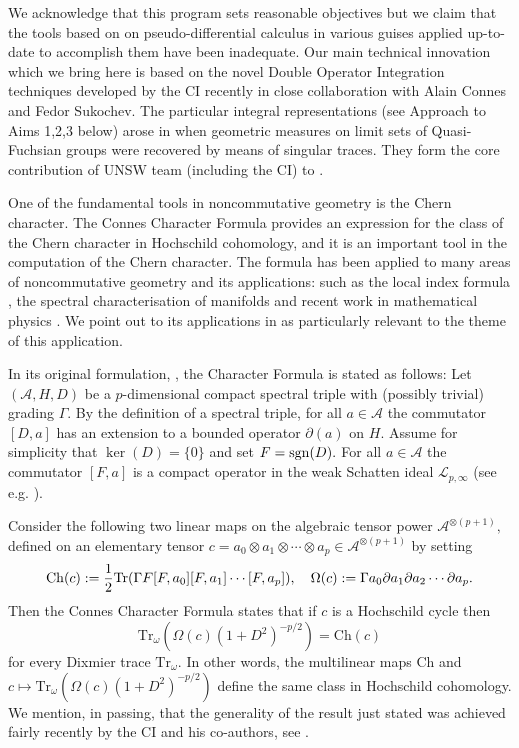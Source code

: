 \documentclass[12pt]{article}
\begin{document}
We acknowledge that this program sets reasonable objectives but we claim that the tools based on on pseudo-differential calculus in various guises applied up-to-date to accomplish them have been inadequate. Our main technical innovation which we bring here is based on the novel Double Operator Integration techniques developed by the CI recently in close collaboration with Alain Connes and Fedor Sukochev. The particular integral representations (see Approach to Aims 1,2,3 below) arose in \cite{Connes_team} when geometric measures on limit sets of Quasi-Fuchsian groups were recovered by means of singular traces. They form the core contribution of UNSW team (including the CI) to \cite{Connes_team}.


One of the fundamental tools in noncommutative geometry is the Chern character. The Connes Character Formula provides an expression for the class of the Chern character in Hochschild cohomology, and it is an important tool in the computation of the Chern character. The formula has been applied to many areas of noncommutative geometry and its applications: such as the local index formula \cite{ConnesMoscovici}, the spectral characterisation of manifolds \cite{Connes-reconstruction} and recent work in mathematical physics \cite{Connes-Chamseddine-Mukhanov-quanta-of-geometry-2015}. We point out to its applications in \cite{Connes-reconstruction} as particularly relevant to the theme of this application.

In its original formulation, \cite{Connes-original-spectral-1995}, the Character Formula is stated as follows: Let $(\mathcal{A},H,D)$ be a $p$-dimensional compact spectral triple     with (possibly trivial) grading $\Gamma.$ By the definition of a spectral triple, for all $a \in \mathcal{A}$ the commutator $[D,a]$ has an extension to a bounded operator $\partial(a)$ on $H.$ Assume for simplicity that $\ker(D)=\{0\}$ and set $F={\rm sgn}(D).$ For all $a \in \mathcal{A}$ the commutator $[F,a]$ is a compact operator in the weak Schatten ideal $\mathcal{L}_{p,\infty}$ (see e.g. \cite{Connes-book, book}).

Consider the following two linear maps on the algebraic tensor power $\mathcal{A}^{\otimes(p+1)},$ defined on an elementary tensor $c = a_0\otimes a_1\otimes \cdots \otimes a_p \in \mathcal{A}^{\otimes(p+1)}$ by setting
$$\mathrm{Ch}(c) := \frac{1}{2}{\rm Tr}(\Gamma F[F,a_0][F,a_1]\cdots[F,a_p]),\quad \Omega(c) := \Gamma a_0\partial a_1\partial a_2\cdots \partial a_p.$$
Then the Connes Character Formula states that if $c$ is a Hochschild cycle then
$$\mathrm{Tr}_\omega(\Omega(c)(1+D^2)^{-p/2}) =\mathrm{Ch}(c)$$
for every Dixmier trace $\mathrm{Tr}_\omega$. In other words, the multilinear maps $\mathrm{Ch}$ and $c \mapsto \mathrm{Tr}_\omega(\Omega(c)(1+D^2)^{-p/2})$ define the same class in Hochschild cohomology. We mention, in passing, that the generality of the result just stated was achieved fairly recently by the CI and his co-authors, see \cite{CRSZ}.
    
\end{document}
